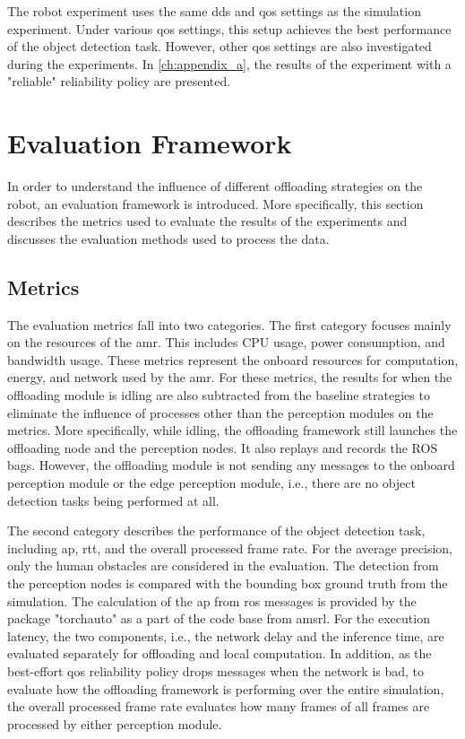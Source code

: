 The robot experiment uses the same \gls{dds} and \gls{qos} settings as the simulation experiment. Under various \gls{qos} settings, this setup achieves the best performance of the object detection task. However, other \gls{qos} settings are also investigated during the experiments. In \cref{ch:appendix_a}, the results of the experiment with a "reliable" reliability policy are presented. 

\section{Evaluation Framework}\label{sec:evaluation_framework}

In order to understand the influence of different offloading strategies on the robot, an evaluation framework is introduced. More specifically, this section describes the metrics used to evaluate the results of the experiments and discusses the evaluation methods used to process the data. 

\subsection{Metrics}
 

The evaluation metrics fall into two categories. The first category focuses mainly on the resources of the \gls{amr}. This includes CPU usage, power consumption, and bandwidth usage. These metrics represent the onboard resources for computation, energy, and network used by the \gls{amr}. For these metrics, the results for when the offloading module is idling are also subtracted from the baseline strategies to eliminate the influence of processes other than the perception modules on the metrics. More specifically, while idling, the offloading framework still launches the offloading node and the perception nodes. It also replays and records the ROS bags. However, the offloading module is not sending any messages to the onboard perception module or the edge perception module, i.e., there are no object detection tasks being performed at all. 

The second category describes the performance of the object detection task, including \gls{ap}, \gls{rtt}, and the overall processed frame rate. For the average precision, only the human obstacles are considered in the evaluation. The detection from the perception nodes is compared with the bounding box ground truth from the simulation. The calculation of the \gls{ap} from \gls{ros} messages is provided by the package "torchauto" as a part of the code base from \gls{amsrl}. For the execution latency, the two components, i.e., the network delay and the inference time, are evaluated separately for offloading and local computation. In addition, as the best-effort \gls{qos} reliability policy drops messages when the network is bad, to evaluate how the offloading framework is performing over the entire simulation, the overall processed frame rate evaluates how many frames of all frames are processed by either perception module.

